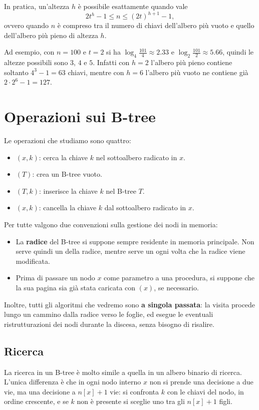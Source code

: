 In pratica, un'altezza $h$ è possibile esattamente quando vale
\[
2t^h - 1 \le n \le (2t)^{h+1} - 1,
\]
ovvero quando $n$ è compreso tra il numero di chiavi dell'albero più vuoto e quello dell'albero più pieno di altezza $h$.

Ad esempio, con $n = 100$ e $t = 2$ si ha $\log_4 \frac{101}{4} \approx 2.33$ e $\log_2 \frac{101}{2} \approx 5.66$, quindi le altezze possibili sono $3$, $4$ e $5$. Infatti con $h = 2$ l'albero più pieno contiene soltanto $4^3 - 1 = 63$ chiavi, mentre con $h = 6$ l'albero più vuoto ne contiene già $2 \cdot 2^6 - 1 = 127$.

\section{Operazioni sui B-tree}\label{sec:btree-op}
Le operazioni che studiamo sono quattro:
\begin{itemize}
    \item \BTreeSearch$(x,k)$: cerca la chiave $k$ nel sottoalbero radicato in $x$.
    \item \BTreeCreate$(T)$: crea un B-tree vuoto.
    \item \BTreeInsert$(T,k)$: inserisce la chiave $k$ nel B-tree $T$.
    \item \BTreeDelete$(x,k)$: cancella la chiave $k$ dal sottoalbero radicato in $x$.
\end{itemize}
Per tutte valgono due convenzioni sulla gestione dei nodi in memoria:
\begin{itemize}
    \item La \textbf{radice} del B-tree si suppone sempre residente in memoria principale. Non serve quindi un \PageRead{} della radice, mentre serve un \PageWrite{} ogni volta che la radice viene modificata.
    \item Prima di passare un nodo $x$ come parametro a una procedura, si suppone che la sua pagina sia già stata caricata con \PageRead$(x)$, se necessario.
\end{itemize}
Inoltre, tutti gli algoritmi che vedremo sono \textbf{a singola passata}: la visita procede lungo un cammino dalla radice verso le foglie, ed esegue le eventuali ristrutturazioni dei nodi durante la discesa, senza bisogno di risalire.

\subsection{Ricerca}\label{sec:btree-search}
La ricerca in un B-tree è molto simile a quella in un albero binario di ricerca. L'unica differenza è che in ogni nodo interno $x$ non si prende una decisione a due vie, ma una decisione a $n[x]+1$ vie: si confronta $k$ con le chiavi del nodo, in ordine crescente, e se $k$ non è presente si sceglie uno tra gli $n[x]+1$ figli.

